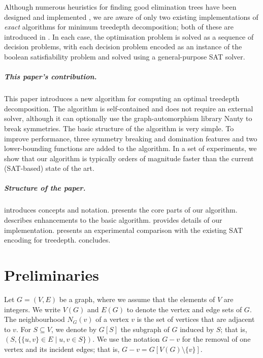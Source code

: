 {    Although numerous heuristics for finding good elimination trees have been designed
    and implemented \cite{groer2012inddgo},
    we are aware of only two existing implementations of \emph{exact} algorithms for minimum treedepth
    decomposition; both of these are introduced in \cite{DBLP:conf/alenex/GanianLOS19,DBLP:journals/corr/abs-1911-12995}.  In
    each case, the optimisation problem is solved as a sequence of decision problems,
    with each decision problem encoded as an instance of the boolean satisfiability problem
    and solved using a general-purpose SAT solver.

    \subparagraph*{This paper's contribution.} This paper introduces a new algorithm for computing an optimal treedepth
    decomposition.  The algorithm is self-contained and does not require an external solver,
    although it can optionally use the graph-automorphism library Nauty to break symmetries.
    The basic structure of the
    algorithm is very simple.  To improve performance, three symmetry breaking and domination features
    and two lower-bounding functions are added to the algorithm.  In a set of experiments, we show that our
    algorithm is typically orders of magnitude faster than the current (SAT-based) state of the art.

    \subparagraph*{Structure of the paper.}  introduces concepts and notation.
     presents the core parts of our algorithm.  
    describes enhancements to the basic algorithm.   provides details of our implementation.
     presents an experimental comparison with the existing SAT encoding for treedepth.
     concludes.

    \section{Preliminaries}\label{sec:preliminaries}

    Let $G=(V,E)$ be a graph, where we assume that the elements of $V$ are integers.
    We write $V(G)$ and $E(G)$ to denote the vertex and edge sets of $G$.
    The neighbourhood $N_G(v)$ of a vertex $v$ is the set of vertices that are adjacent to $v$.
    For $S \subseteq V$, we denote by $G[S]$ the subgraph of $G$
    induced by $S$; that is, $(S, \{\{u,v\} \in E \mid u,v \in S\})$.
    We use the notation $G - v$ for the removal of one vertex and its incident edges;
    that is, $G - v = G[V(G) \setminus \{v\}]$.

}
